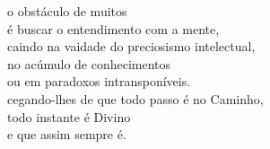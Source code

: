 o obstáculo de muitos\\
é buscar o entendimento com a mente,\\
caindo na vaidade do preciosismo intelectual,\\
no acúmulo de conhecimentos\\
ou em paradoxos intransponíveis.\\
cegando-lhes de que todo passo é no Caminho,\\
todo instante é Divino\\
e que assim sempre é.
